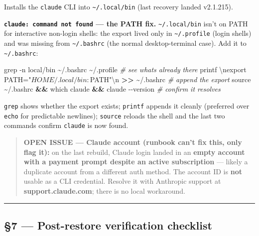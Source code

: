 \documentclass[
]{article}
\newenvironment{Shaded}{\begin{snugshade}}{\end{snugshade}}
\newcommand{\AttributeTok}[1]{\textcolor[rgb]{0.77,0.63,0.00}{#1}}
\newcommand{\BuiltInTok}[1]{#1}
\newcommand{\CommentTok}[1]{\textcolor[rgb]{0.56,0.35,0.01}{\textit{#1}}}
\newcommand{\ExtensionTok}[1]{#1}
\newcommand{\FunctionTok}[1]{\textcolor[rgb]{0.00,0.00,0.00}{#1}}
\newcommand{\KeywordTok}[1]{\textcolor[rgb]{0.13,0.29,0.53}{\textbf{#1}}}
\newcommand{\NormalTok}[1]{#1}
\newcommand{\OperatorTok}[1]{\textcolor[rgb]{0.81,0.36,0.00}{\textbf{#1}}}
\newcommand{\StringTok}[1]{\textcolor[rgb]{0.31,0.60,0.02}{#1}}
\begin{document}
Installs the \texttt{claude} CLI into
\texttt{\textasciitilde{}/.local/bin} (last recovery landed v2.1.215).

\textbf{\texttt{claude:\ command\ not\ found} --- the PATH fix.}
\texttt{\textasciitilde{}/.local/bin} isn't on PATH for interactive
non-login shells: the export lived only in
\texttt{\textasciitilde{}/.profile} (login shells) and was missing from
\texttt{\textasciitilde{}/.bashrc} (the normal desktop-terminal case).
Add it to \texttt{\textasciitilde{}/.bashrc}:

\begin{Shaded}
\begin{Highlighting}[]
\FunctionTok{grep} \AttributeTok{{-}n} \StringTok{\textquotesingle{}local/bin\textquotesingle{}}\NormalTok{ \textasciitilde{}/.bashrc \textasciitilde{}/.profile                       }\CommentTok{\# see what\textquotesingle{}s already there}
\BuiltInTok{printf} \StringTok{\textquotesingle{}\textbackslash{}nexport PATH="$HOME/.local/bin:$PATH"\textbackslash{}n\textquotesingle{}} \OperatorTok{\textgreater{}\textgreater{}}\NormalTok{ \textasciitilde{}/.bashrc  }\CommentTok{\# append the export}
\BuiltInTok{source}\NormalTok{ \textasciitilde{}/.bashrc }\KeywordTok{\&\&} \FunctionTok{which}\NormalTok{ claude }\KeywordTok{\&\&} \ExtensionTok{claude} \AttributeTok{{-}{-}version}           \CommentTok{\# confirm it resolves}
\end{Highlighting}
\end{Shaded}

\texttt{grep} shows whether the export exists; \texttt{printf} appends
it cleanly (preferred over \texttt{echo} for predictable newlines);
\texttt{source} reloads the shell and the last two commands confirm
\texttt{claude} is now found.

\begin{quote}
\textbf{OPEN ISSUE --- Claude account (runbook can't fix this, only flag
it):} on the last rebuild, Claude login landed in an \textbf{empty
account with a payment prompt despite an active subscription} --- likely
a duplicate account from a different auth method. The account ID is
\textbf{not} usable as a CLI credential. Resolve it with Anthropic
support at \textbf{support.claude.com}; there is no local workaround.
\end{quote}

\begin{center}\rule{0.5\linewidth}{0.5pt}\end{center}

\hypertarget{post-restore-verification-checklist}{%
\subsection{§7 --- Post-restore verification
checklist}\label{post-restore-verification-checklist}}
\end{document}
